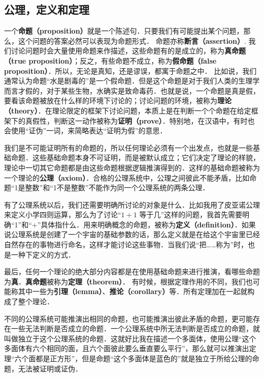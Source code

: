 
\subsection{公理，定义和定理}
一个\textbf{命题（proposition）}就是一个陈述句．只要我们有可能提出某个问题，那么，这个问题的答案必然可以表现为命题形式． 命题亦称\textbf{断言（assertion）}. 我们讨论问题时会大量使用命题来作描述，这些命题有的是成立的，称为\textbf{真命题（true proposition）}；反之，有些命题不成立，称为\textbf{假命题（false proposition）}．所以，无论是真知，还是谬误，都寓于命题之中． 比如说，我们通常认为命题“水是剧毒的”是一个假命题．但是这个命题是对于我们人类的生理学而言才假的，对于某些生物，水确实是致命毒药．也就是说，一个命题是真是假，要看该命题被放在什么样的环境下讨论的；讨论问题的环境，被称为\textbf{理论（theory）}．在理论限定的框架下讨论问题，本质上是在判断一个个命题在给定框架下的真假性，判断这一动作被称为\textbf{证明（prove）}．特别地，在汉语中，有时也会使用“证伪”一词，来简略表达“证明为假”的意思．

我们是不可能证明所有的命题的，所以任何理论必须有一个出发点，也就是一些基础命题．这些基础命题本身不可证明，而是被默认成立；它们决定了理论的样貌，理论中一切其它命题都是由这些命题根据逻辑推演得到的．这样的基础命题被称为一个理论的\textbf{公理（axiom）}．合格的公理系统中，公理之间彼此不能矛盾，比如命题“1是整数”和“1不是整数”不能作为同一个公理系统的两条公理．

有了公理系统以后，我们还需要明确所讨论的对象是什么．比如我用了皮亚诺公理来定义小学四则运算，那么为了讨论“$1+1$ 等于几”这样的问题，我首先需要明确“1”和“$+$”具体指什么．用来明确概念的命题，被称为\textbf{定义（definition）}．如果说公理系统是创建了一个宇宙的基础参数的话，那么定义就是在给这个宇宙里已经自然存在的事物进行命名，这样才能讨论这些事物．当我们说“把……称为”时，也是一种下定义的方式．

最后，任何一个理论的绝大部分内容都是在使用基础命题来进行推演，看哪些命题为\textbf{真}．\textbf{真命题}被称为\textbf{定理（theorem）}． 有时候，根据定理作用的不同，我们也可能称其中一些为\textbf{引理（lemma）}、\textbf{推论（corollary）}等．所有定理加在一起就构成了整个理论．

不同的公理系统可能推演出相同的命题，也可能推演出彼此矛盾的命题，更可能存在一些无法判断是否成立的命题．一个公理系统中所无法判断是否成立的命题，就叫做独立于这个公理系统的命题．这就好比我在描述一个多面体，使用公理“这个多面体有六个相同的面，且六个面彼此要么垂直要么平行”，那么就可以推演出定理“六个面都是正方形”，但是命题“这个多面体是蓝色的”就是独立于所给公理的命题，无法被证明或证伪．

